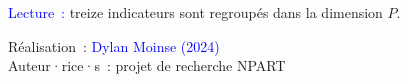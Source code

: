 \begin{table}[h!]
    \label{table-chap6:indicateurs-place}
        \vspace{5pt}
        \begin{flushleft}\scriptsize{
        \textcolor{blue}{Lecture~:} treize indicateurs sont regroupés dans la dimension \(P\). 
        }\end{flushleft}
        \begin{flushright}\scriptsize{
        Réalisation~: \textcolor{blue}{Dylan Moinse (2024)}
        \\
        Auteur·rice·s~: projet de recherche \acrshort{NPART}
        }\end{flushright}
        \end{table}